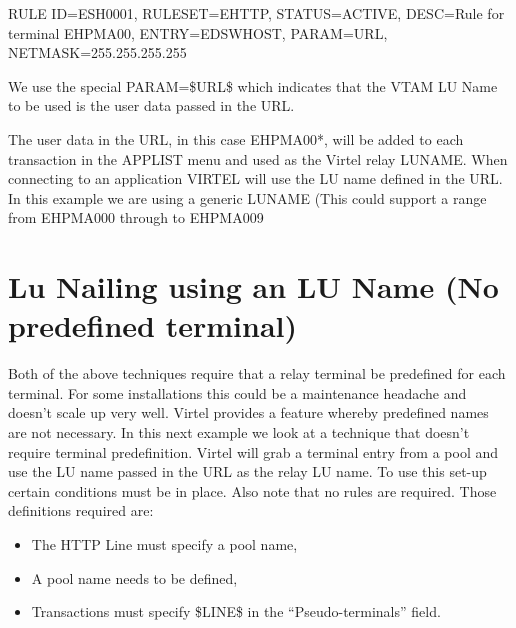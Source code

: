 \documentclass[letterpaper,10pt,english]{sphinxmanual}
\begin{document}
\begin{sphinxVerbatim}[commandchars=\\\{\}]
RULE ID=ESH0001, \PYGZhy{}
RULESET=E\PYGZhy{}HTTP, \PYGZhy{}
STATUS=ACTIVE, \PYGZhy{}
DESC=\PYGZsq{}Rule for terminal EHPMA00\PYGZsq{}, \PYGZhy{}
ENTRY=EDSWHOST, \PYGZhy{}
PARAM=\PYGZdl{}URL\PYGZdl{}, \PYGZhy{}
NETMASK=255.255.255.255
\end{sphinxVerbatim}

We use the special PARAM=\$URL\$ which indicates that the VTAM LU Name to be used is the user data passed in the URL.


The user data in the URL, in this case EHPMA00*, will be added to each transaction in the APPLIST menu and used as the Virtel relay LUNAME. When connecting to an application VIRTEL will use the LU name defined in the URL. In this example we are using a generic LUNAME (This could support a range from EHPMA000 through to EHPMA009

\ignorespaces 

\section{Lu Nailing using an LU Name (No predefined terminal)}
\label{\detokenize{Customization:lu-nailing-using-an-lu-name-no-predefined-terminal}}\label{\detokenize{Customization:index-59}}
Both of the above techniques require that a relay terminal be predefined for each terminal. For some installations this could be a maintenance headache and doesn’t scale up very well. Virtel provides a feature whereby predefined names are not necessary. In this next example we look at a technique that doesn’t require terminal predefinition. Virtel will
grab a terminal entry from a pool and use the LU name passed in the URL as the relay LU name. To use this set-up certain conditions must be in place. Also note that no rules are required. Those definitions required are:
\begin{itemize}
\item {} 
The HTTP Line must specify a pool name,

\item {} 
A pool name needs to be defined,

\item {} 
Transactions must specify \$LINE\$ in the “Pseudo-terminals” field.

\end{itemize}
\end{document}
